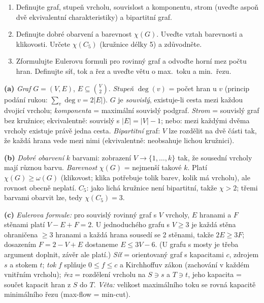 \begin{zadani}
\begin{enumerate}[label=(\alph*)]
  \item {} Definujte graf, stupeň vrcholu, souvislost a komponentu, strom (uveďte aspoň dvě ekvivalentní charakteristiky) a bipartitní graf.
  \item {} Definujte dobré obarvení a barevnost $\chi(G)$. Uveďte vztah barevnosti a klikovosti. Určete $\chi(C_5)$ (kružnice délky 5) a zdůvodněte.
  \item {} Zformulujte Eulerovu formuli pro rovinný graf a odvoďte horní mez počtu hran. Definujte síť, tok a řez a uveďte větu o max.\ toku a min.\ řezu.
\end{enumerate}
\end{zadani}

\begin{reseni}
\textbf{(a)} \emph{Graf} $G=(V,E)$, $E\subseteq\binom{V}{2}$. \emph{Stupeň} $\deg(v)$ = počet hran u $v$ (princip podání rukou: $\sum_v\deg v=2|E|$). $G$ je \emph{souvislý}, existuje-li cesta mezi každou dvojicí vrcholu; \emph{komponenta} = maximální souvislý podgraf. \emph{Strom} = souvislý graf bez kružnice; ekvivalentně: souvislý s $|E|=|V|-1$; nebo: mezi každými dvěma vrcholy existuje právě jedna cesta. \emph{Bipartitní} graf: $V$ lze rozdělit na dvě části tak, že každá hrana vede mezi nimi (ekvivalentně: neobsahuje lichou kružnici).

\textbf{(b)} \emph{Dobré obarvení} $k$ barvami: zobrazení $V\to\{1,\dots,k\}$ tak, že sousední vrcholy mají různou barvu. \emph{Barevnost} $\chi(G)$ = nejmenší takové $k$. Platí $\chi(G)\ge\omega(G)$ (klikovost; klika potřebuje tolik barev, kolik má vrcholu), ale rovnost obecně neplatí. $C_5$: jako lichá kružnice není bipartitní, takže $\chi>2$; třemi barvami obarvit lze, tedy $\chi(C_5)=3$.

\textbf{(c)} \emph{Eulerova formule:} pro souvislý rovinný graf s $V$ vrcholy, $E$ hranami a $F$ stěnami platí $V-E+F=2$. U jednoduchého grafu s $V\ge3$ je každá stěna ohraničena $\ge3$ hranami a každá hrana sousedí se 2 stěnami, takže $2E\ge3F$; dosazením $F=2-V+E$ dostaneme $E\le 3V-6$. (U grafu s mosty je třeba argument doplnit, závěr ale platí.) \emph{Síť} = orientovaný graf s kapacitami $c$, zdrojem $s$ a stokem $t$; \emph{tok} $f$ splňuje $0\le f\le c$ a Kirchhoffuv zákon (zachování v každém vnitřním vrcholu); \emph{řez} = rozdělení vrcholu na $S\ni s$ a $T\ni t$, jeho kapacita = součet kapacit hran z $S$ do $T$. \emph{Věta:} velikost maximálního toku se rovná kapacitě minimálního řezu (max-flow = min-cut).
\end{reseni}

